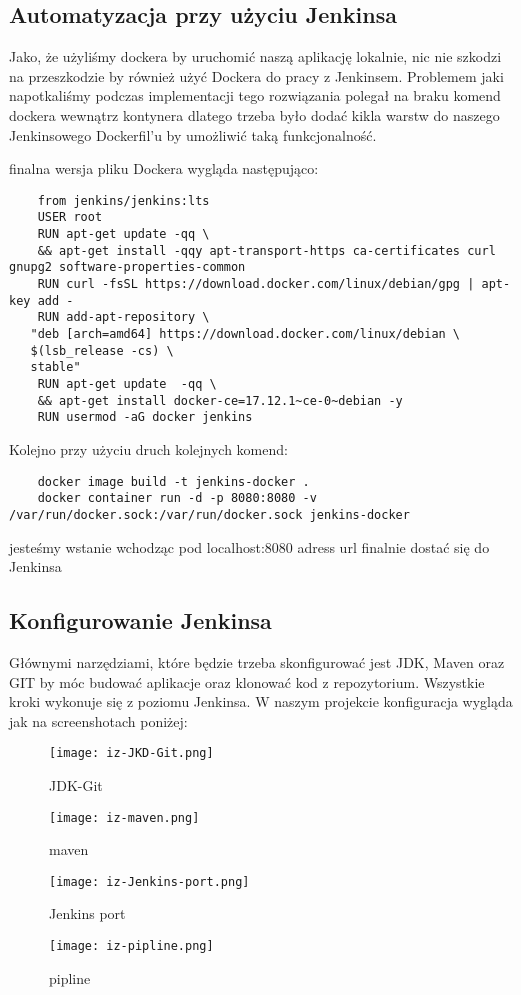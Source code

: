 \subsection{Automatyzacja przy użyciu Jenkinsa}

Jako, że użyliśmy dockera by uruchomić naszą aplikację lokalnie, nic nie szkodzi na przeszkodzie by również użyć Dockera do pracy z Jenkinsem. Problemem jaki napotkaliśmy podczas implementacji tego rozwiązania polegał na braku komend dockera wewnątrz kontynera dlatego trzeba było dodać kikla warstw do naszego Jenkinsowego Dockerfil'u by umożliwić taką funkcjonalność. 

finalna wersja pliku Dockera wygląda następująco: 

\begin{lstlisting}
    from jenkins/jenkins:lts
    USER root
    RUN apt-get update -qq \
    && apt-get install -qqy apt-transport-https ca-certificates curl gnupg2 software-properties-common
    RUN curl -fsSL https://download.docker.com/linux/debian/gpg | apt-key add -
    RUN add-apt-repository \
   "deb [arch=amd64] https://download.docker.com/linux/debian \
   $(lsb_release -cs) \
   stable"
    RUN apt-get update  -qq \
    && apt-get install docker-ce=17.12.1~ce-0~debian -y
    RUN usermod -aG docker jenkins
\end{lstlisting}

Kolejno przy użyciu druch kolejnych komend:
\begin{lstlisting}
    docker image build -t jenkins-docker .
    docker container run -d -p 8080:8080 -v /var/run/docker.sock:/var/run/docker.sock jenkins-docker
\end{lstlisting}

jesteśmy wstanie wchodząc pod localhost:8080 adress url finalnie dostać się do Jenkinsa

\subsection{Konfigurowanie Jenkinsa}

Głównymi narzędziami, które będzie trzeba skonfigurować jest JDK, Maven oraz GIT by móc budować aplikacje oraz klonować kod z repozytorium. Wszystkie kroki wykonuje się z poziomu Jenkinsa. W naszym projekcie konfiguracja wygląda jak na screenshotach poniżej:

\begin{figure}[htbp]
    \centering
    \texttt{[image: iz-JKD-Git.png]}
    \caption{JDK-Git}
    \label{fig:JDK-Git}
\end{figure}
\begin{figure}[htbp]
    \centering
    \texttt{[image: iz-maven.png]}
    \caption{maven}
    \label{fig:maven}
\end{figure}
\begin{figure}[htbp]
    \centering
    \texttt{[image: iz-Jenkins-port.png]}
    \caption{Jenkins port}
    \label{fig:Jenkins-port}
\end{figure}
\begin{figure}[htbp]
    \centering
    \texttt{[image: iz-pipline.png]}
    \caption{pipline}
    \label{fig:pipeline}
\end{figure}


